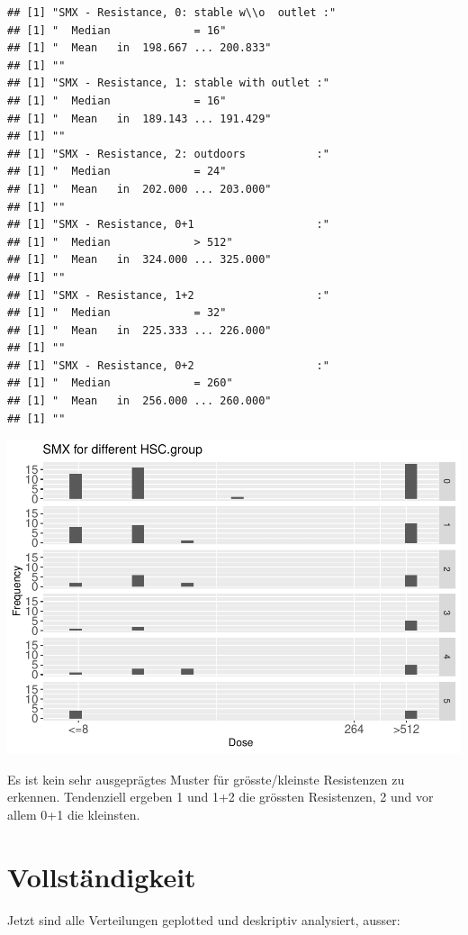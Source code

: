 \documentclass[
]{article}
\begin{document}
\begin{verbatim}
## [1] "SMX - Resistance, 0: stable w\\o  outlet :"
## [1] "  Median             = 16"
## [1] "  Mean   in  198.667 ... 200.833"
## [1] ""
## [1] "SMX - Resistance, 1: stable with outlet :"
## [1] "  Median             = 16"
## [1] "  Mean   in  189.143 ... 191.429"
## [1] ""
## [1] "SMX - Resistance, 2: outdoors           :"
## [1] "  Median             = 24"
## [1] "  Mean   in  202.000 ... 203.000"
## [1] ""
## [1] "SMX - Resistance, 0+1                   :"
## [1] "  Median             > 512"
## [1] "  Mean   in  324.000 ... 325.000"
## [1] ""
## [1] "SMX - Resistance, 1+2                   :"
## [1] "  Median             = 32"
## [1] "  Mean   in  225.333 ... 226.000"
## [1] ""
## [1] "SMX - Resistance, 0+2                   :"
## [1] "  Median             = 260"
## [1] "  Mean   in  256.000 ... 260.000"
## [1] ""
\end{verbatim}

\includegraphics{Verteilungen_files/figure-latex/unnamed-chunk-56-1.pdf}

Es ist kein sehr ausgeprägtes Muster für grösste/kleinste Resistenzen zu
erkennen. Tendenziell ergeben 1 und 1+2 die grössten Resistenzen, 2 und
vor allem 0+1 die kleinsten.

\hypertarget{vollstuxe4ndigkeit}{%
\section{Vollständigkeit}\label{vollstuxe4ndigkeit}}

Jetzt sind alle Verteilungen geplotted und deskriptiv analysiert,
ausser:
\end{document}
